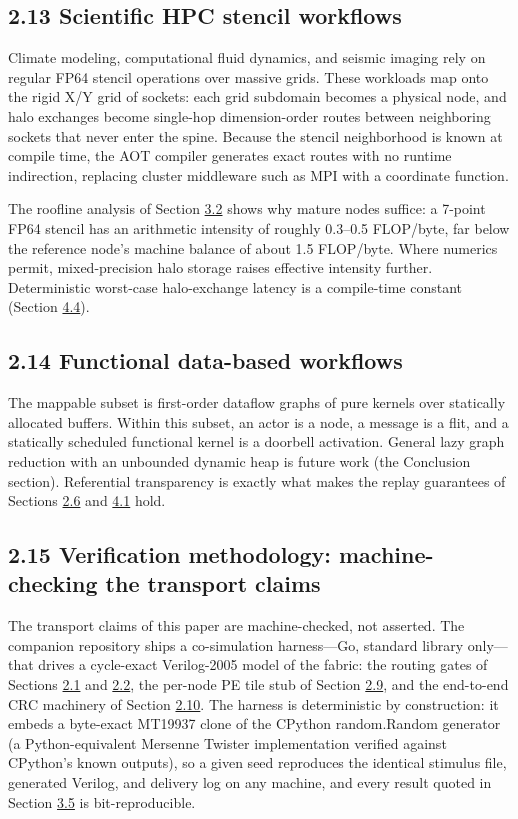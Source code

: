 \documentclass[10pt,twocolumn]{article}
\begin{document}
\subsection*{2.13 Scientific HPC stencil workflows}\label{sec:2.13}

Climate modeling, computational fluid dynamics, and seismic imaging rely on regular FP64 stencil operations over massive grids. These workloads map onto the rigid X/Y grid of sockets: each grid subdomain becomes a physical node, and halo exchanges become single-hop dimension-order routes between neighboring sockets that never enter the spine. Because the stencil neighborhood is known at compile time, the AOT compiler generates exact routes with no runtime indirection, replacing cluster middleware such as MPI\cite{19} with a coordinate function.

The roofline analysis of Section \hyperref[sec:3.2]{3.2} shows why mature nodes suffice: a 7-point FP64 stencil has an arithmetic intensity of roughly 0.3--0.5 FLOP/byte, far below the reference node's machine balance of about 1.5 FLOP/byte\cite{5}. Where numerics permit, mixed-precision halo storage raises effective intensity further. Deterministic worst-case halo-exchange latency is a compile-time constant (Section \hyperref[sec:4.4]{4.4}).

\subsection*{2.14 Functional data-based workflows}\label{sec:2.14}

The mappable subset is first-order dataflow graphs of pure kernels over statically allocated buffers\cite{6,11}. Within this subset, an actor is a node, a message is a flit, and a statically scheduled functional kernel is a doorbell activation. General lazy graph reduction with an unbounded dynamic heap is future work (the Conclusion section). Referential transparency is exactly what makes the replay guarantees of Sections \hyperref[sec:2.6]{2.6} and \hyperref[sec:4.1]{4.1} hold.

\subsection*{2.15 Verification methodology: machine-checking the transport claims}\label{sec:2.15}

The transport claims of this paper are machine-checked, not asserted. The companion repository ships a co-simulation harness---Go, standard library only---that drives a cycle-exact Verilog-2005 model of the fabric: the routing gates of Sections \hyperref[sec:2.1]{2.1} and \hyperref[sec:2.2]{2.2}, the per-node PE tile stub of Section \hyperref[sec:2.9]{2.9}, and the end-to-end CRC machinery of Section \hyperref[sec:2.10]{2.10}\cite{28}. The harness is deterministic by construction: it embeds a byte-exact MT19937 clone of the CPython random.Random generator (a Python-equivalent Mersenne Twister implementation verified against CPython's known outputs), so a given seed reproduces the identical stimulus file, generated Verilog, and delivery log on any machine, and every result quoted in Section \hyperref[sec:3.5]{3.5} is bit-reproducible.
\end{document}
